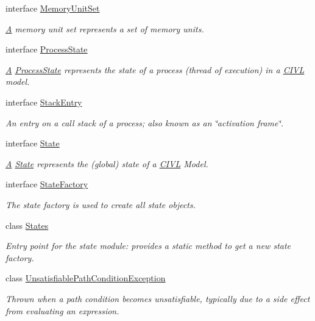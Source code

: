 \begin{DoxyCompactItemize}
interface \hyperlink{interfaceedu_1_1udel_1_1cis_1_1vsl_1_1civl_1_1state_1_1IF_1_1MemoryUnitSet}{Memory\+Unit\+Set}
\begin{DoxyCompactList}\small\item\em \hyperlink{structA}{A} memory unit set represents a set of memory units. \end{DoxyCompactList}\item 
interface \hyperlink{interfaceedu_1_1udel_1_1cis_1_1vsl_1_1civl_1_1state_1_1IF_1_1ProcessState}{Process\+State}
\begin{DoxyCompactList}\small\item\em \hyperlink{structA}{A} \hyperlink{interfaceedu_1_1udel_1_1cis_1_1vsl_1_1civl_1_1state_1_1IF_1_1ProcessState}{Process\+State} represents the state of a process (thread of execution) in a \hyperlink{classedu_1_1udel_1_1cis_1_1vsl_1_1civl_1_1CIVL}{C\+I\+V\+L} model. \end{DoxyCompactList}\item 
interface \hyperlink{interfaceedu_1_1udel_1_1cis_1_1vsl_1_1civl_1_1state_1_1IF_1_1StackEntry}{Stack\+Entry}
\begin{DoxyCompactList}\small\item\em An entry on a call stack of a process; also known as an \char`\"{}activation frame\char`\"{}. \end{DoxyCompactList}\item 
interface \hyperlink{interfaceedu_1_1udel_1_1cis_1_1vsl_1_1civl_1_1state_1_1IF_1_1State}{State}
\begin{DoxyCompactList}\small\item\em \hyperlink{structA}{A} \hyperlink{interfaceedu_1_1udel_1_1cis_1_1vsl_1_1civl_1_1state_1_1IF_1_1State}{State} represents the (global) state of a \hyperlink{classedu_1_1udel_1_1cis_1_1vsl_1_1civl_1_1CIVL}{C\+I\+V\+L} Model. \end{DoxyCompactList}\item 
interface \hyperlink{interfaceedu_1_1udel_1_1cis_1_1vsl_1_1civl_1_1state_1_1IF_1_1StateFactory}{State\+Factory}
\begin{DoxyCompactList}\small\item\em The state factory is used to create all state objects. \end{DoxyCompactList}\item 
class \hyperlink{classedu_1_1udel_1_1cis_1_1vsl_1_1civl_1_1state_1_1IF_1_1States}{States}
\begin{DoxyCompactList}\small\item\em Entry point for the state module\+: provides a static method to get a new state factory. \end{DoxyCompactList}\item 
class \hyperlink{classedu_1_1udel_1_1cis_1_1vsl_1_1civl_1_1state_1_1IF_1_1UnsatisfiablePathConditionException}{Unsatisfiable\+Path\+Condition\+Exception}
\begin{DoxyCompactList}\small\item\em Thrown when a path condition becomes unsatisfiable, typically due to a side effect from evaluating an expression. \end{DoxyCompactList}\end{DoxyCompactItemize}


